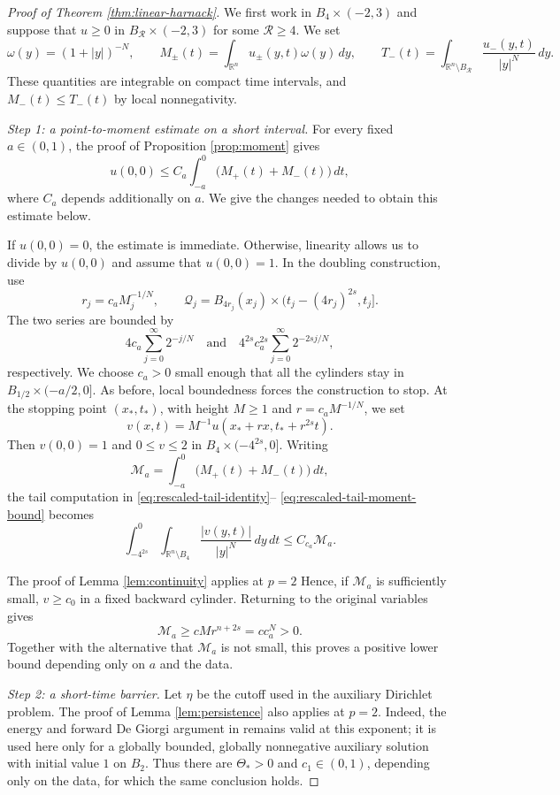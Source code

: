 \documentclass[10pt]{amsart}
\theoremstyle{plain}
\theoremstyle{definition}
\theoremstyle{remark}
\numberwithin{equation}{section}
\newcommand{\R}{\mathbb R}
\begin{document}
\begin{proof}[Proof of Theorem \ref{thm:linear-harnack}]
We first work in $B_4\times(-2,3)$ and suppose that $u\ge0$ in
$B_{\mathcal R}\times(-2,3)$ for some $\mathcal R\ge4$.
We set
\[
\omega(y)=(1+|y|)^{-N},\qquad
M_\pm(t)=\int_{\R^n}u_\pm(y,t)\omega(y)\,dy,
\qquad
T_-(t)=\int_{\R^n\setminus B_{\mathcal R}}
\frac{u_-(y,t)}{|y|^N}\,dy.
\]
These quantities are integrable on compact time intervals, and
$M_-(t)\le T_-(t)$ by local nonnegativity.

\smallskip
\noindent\emph{Step 1: a point-to-moment estimate on a short interval.}
For every fixed $a\in(0,1)$, the proof of Proposition
\ref{prop:moment} gives
\begin{equation}\label{eq:linear-point-moment}
u(0,0)\le C_a\int_{-a}^0\bigl(M_+(t)+M_-(t)\bigr)\,dt,
\end{equation}
where $C_a$ depends additionally on $a$. We give the changes needed
to obtain this estimate below. 

If $u(0,0)=0$, the estimate is immediate. Otherwise, linearity
allows us to divide by $u(0,0)$ and assume that $u(0,0)=1$.
In the doubling construction, use
\[
r_j=c_aM_j^{-1/N},\qquad
\mathcal Q_j=B_{4r_j}(x_j)\times
\bigl(t_j-(4r_j)^{2s},t_j\bigr].
\]
The two series are bounded by
\[
4c_a\sum_{j=0}^\infty2^{-j/N}
\quad\text{and}\quad
4^{2s}c_a^{2s}\sum_{j=0}^\infty2^{-2sj/N},
\]
respectively. We choose $c_a>0$ small enough that all
the cylinders stay in $B_{1/2}\times(-a/2,0]$. As before,
local boundedness forces the construction to stop. At the stopping
point $(x_*,t_*)$, with height $M\ge1$ and $r=c_aM^{-1/N}$, we set
\[
v(x,t)=M^{-1}u(x_*+rx,t_*+r^{2s}t).
\]
Then $v(0,0)=1$ and $0\le v\le2$ in
$B_4\times(-4^{2s},0]$. Writing
\[
\mathcal M_a=\int_{-a}^0\bigl(M_+(t)+M_-(t)\bigr)\,dt,
\]
the tail computation in \eqref{eq:rescaled-tail-identity}--
\eqref{eq:rescaled-tail-moment-bound} becomes
\[
\int_{-4^{2s}}^0\int_{\R^n\setminus B_4}
\frac{|v(y,t)|}{|y|^N}\,dy\,dt
\le C_{c_a}\mathcal M_a.
\]

The proof of Lemma \ref{lem:continuity} applies at $p=2$
Hence, if $\mathcal M_a$ is
sufficiently small, $v\ge c_0$ in a fixed backward cylinder.
Returning to the original variables gives
\[
\mathcal M_a\ge cMr^{n+2s}=cc_a^N>0.
\]
Together with the alternative that $\mathcal M_a$ is not small,
this proves a positive lower bound depending only on $a$ and the
data. 
\smallskip

\noindent\emph{Step 2: a short-time barrier.}
Let $\eta$ be the cutoff used in the auxiliary Dirichlet problem.
The proof of Lemma \ref{lem:persistence} also applies at $p=2$.
Indeed, the energy and forward De Giorgi argument in
\cite[Lemma~3.11]{APT} remains valid at this exponent; it is used
here only for a globally bounded, globally nonnegative auxiliary
solution with initial value $1$ on $B_2$. Thus there are
$\Theta_*>0$ and $c_1\in(0,1)$, depending only on the data, for
which the same conclusion holds.


\end{proof}
\end{document}
